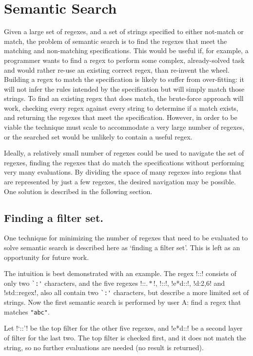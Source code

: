 \section{Semantic Search}
Given a large set of regexes, and a set of strings specified to either not-match or match, the problem of semantic search is to find the regexes that meet the matching and non-matching specifications.  This would be useful if, for example, a programmer wants to find a regex to perform some complex, already-solved task and would rather re-use an existing correct regex, than re-invent the wheel.  Building a regex to match the specification is likely to suffer from over-fitting: it will not infer the rules intended by the specification but will simply match those strings.  To find an existing regex that does match, the brute-force approach will work, checking every regex against every string to determine if a match exists, and returning the regexes that meet the specification.  However, in order to be viable the technique must scale to accommodate a very large number of regexes, or the searched set would be unlikely to contain a useful regex.

Ideally, a relatively small number of regexes could be used to navigate the set of regexes, finding the regexes that do match the specifications without performing very many evaluations.  By dividing the space of many regexes into regions that are represented by just a few regexes, the desired navigation may be possible.  One solution is described in the following section.

\subsection{Finding a filter set.} One technique for minimizing the number of regexes that need to be evaluated to solve semantic search is described here as `finding a filter set'.  This is left as an opportunity for future work.

The intuition is best demonstrated with an example.  The regex \cverb!::! consists of only two \verb!`:'! characters, and the five regexes \cverb!::\(.*\)!, \cverb!\s*::\s*!, \cverb!e*d::!, \cverb!d:{2,6}! and \cverb!std::regex!, also all contain two \verb!`:'! characters, but describe a more limited set of strings.  Now the first semantic search is performed by user A: find a regex that matches \verb!"abc"!.

Let \cverb!`::'! be the top filter for the other five regexes, and \cverb!e*d::! be a second layer of filter for the last two.  The top filter is checked first, and it does not match the string, so no further evaluations are needed (no result is returned).

